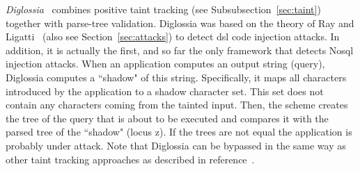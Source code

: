 \documentclass[conference]{IEEEtran}
\begin{document}
{\it Diglossia}~\cite{SMS13} combines positive taint tracking (see
Subsubsection~\ref{sec:taint}) together with parse-tree validation.
Diglossia was based on the theory of Ray and Ligatti~\cite{RL12b}
(also see Section~\ref{sec:attacks}) to detect {\sc dsl} code
injection attacks. In addition, it is actually the first, and so far
the only framework that detects No{\sc sql} injection attacks. When an
application computes an output string (query), Diglossia computes a
``shadow" of this string. Specifically, it maps all characters
introduced by the application to a shadow character set. This set does
not contain any characters coming from the tainted input. Then, the
scheme creates the tree of the query that is about to be executed and
compares it with the parsed tree of the ``shadow" (locus {\sc z}). If
the trees are not equal the application is probably under attack. Note
that Diglossia can be bypassed in the same way as other taint
tracking approaches as described in reference~\cite{NBR14}.
\end{document}

